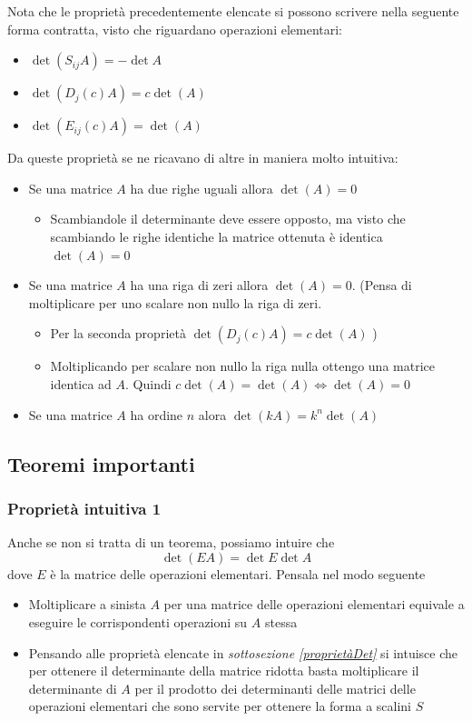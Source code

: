Nota che le proprietà precedentemente elencate si possono scrivere nella seguente forma contratta, visto che riguardano operazioni elementari:
\begin{itemize}
	\item $ \det \left( S_{ij}A \right) = - \det A  $
	\item $ \det \left( D_j \left( c \right)A  \right)  = c \det \left( A \right) $
	\item $ \det \left( E_{ij}\left( c \right) A \right) = \det \left( A \right)  $
\end{itemize}
Da queste proprietà se ne ricavano di altre in maniera molto intuitiva:
\begin{itemize}
	\item Se una matrice $ A $ ha due righe uguali allora $ \det\left( A \right)  = 0 $
	      \begin{itemize}
		      \item Scambiandole il determinante deve essere opposto, ma visto che scambiando le righe identiche la matrice ottenuta è identica $ \det \left( A \right) =0 $
	      \end{itemize}
	\item Se una matrice $ A $ ha una riga di zeri allora $ \det \left( A \right)  =0 $. (Pensa di moltiplicare per uno scalare non nullo la riga di zeri.
	      \begin{itemize}
		      \item Per la seconda proprietà $ \det \left( D_j\left( c \right) A \right) = c \det\left( A \right) $ )
		      \item Moltiplicando per scalare non nullo la riga nulla ottengo una matrice identica ad $ A $. Quindi $ c \det \left( A \right)  = \det \left( A \right) \Leftrightarrow \det\left( A \right) =0 $
	      \end{itemize}
	\item Se una matrice $  A $ ha ordine $ n $ alora $ \det\left( kA \right)  = k^{n} \det \left( A \right)  $
\end{itemize}

\subsection{Teoremi importanti}
\subsubsection*{Proprietà intuitiva 1}
Anche se non si tratta di un teorema, possiamo intuire che
\[
	\det\left( EA \right) = \det E \det A
\]
dove $ E $ è la matrice delle operazioni elementari. Pensala nel modo seguente
\begin{itemize}
	\item Moltiplicare a sinista $ A $ per una matrice delle operazioni elementari equivale a eseguire le corrispondenti operazioni su $ A $ stessa
	\item Pensando alle proprietà elencate in \textit{sottosezione \ref{proprietàDet}} si intuisce che per ottenere il determinante della matrice ridotta basta moltiplicare il determinante di $ A $ per il prodotto dei determinanti delle matrici delle operazioni elementari che sono servite per ottenere la forma a scalini $ S $
\end{itemize}
